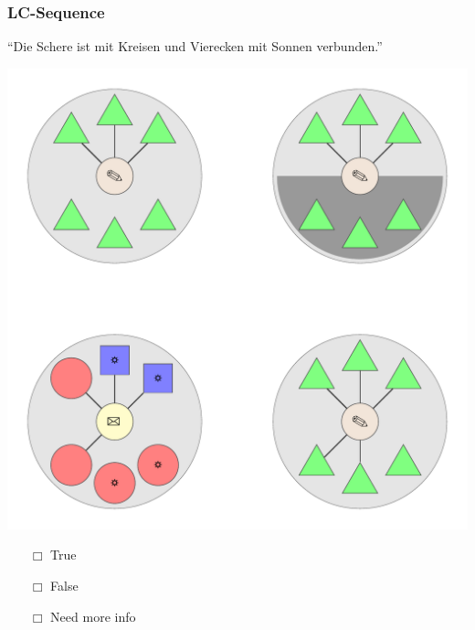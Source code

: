 \documentclass[fleqn,10pt,serif,xcolor=dvipsnames]{beamer}
\newcommand{\LC}{LC}
\newcommand{\mymark}[1]{{\color{blue}{#1}}}
\begin{document}
\begin{frame}
  \frametitle{\LC-Sequence}
  \begin{center}
    ``Die Schere ist mit Kreisen und Vierecken mit Sonnen verbunden.''

    \vspace{0.1cm}

    \includegraphics[width=0.5 \textwidth]{../../pictures/lc_01_6.pdf}

    \vspace{0.1cm}

    \begin{multicols}{3}
      \begin{itemize} 
      \item[$\Box$] True\\
        \onslide<2>{$\leadsto$  \mymark{false}}
      \item[$\Box$] False\\
        \onslide<2>{$\leadsto$ \mymark{EC}}
      \item[$\Box$] Need more info 
      \end{itemize}
    \end{multicols}

  \end{center}
\end{frame}
\end{document}
